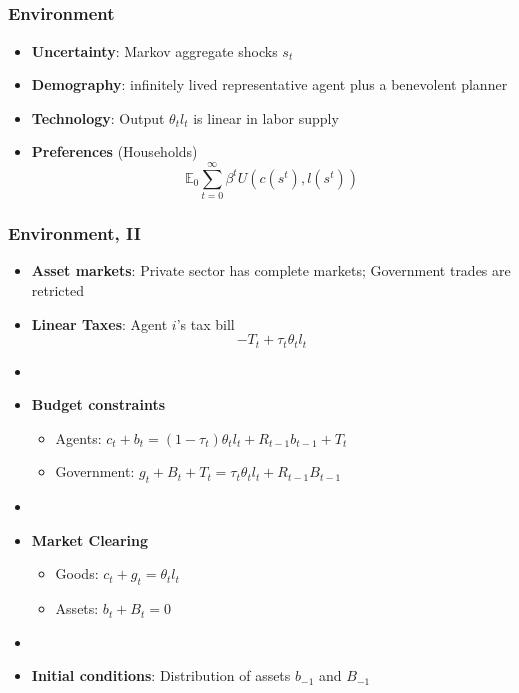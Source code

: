 \documentclass{beamer}
\begin{document}
\subsection{}

\begin{frame}
 \frametitle{Environment}
 \begin{itemize}
 \item \textbf{Uncertainty}: Markov aggregate shocks $s_t$
  \item \textbf{Demography}: infinitely lived representative agent plus a benevolent planner
  \item \textbf{Technology}: Output  $\theta_{t} l_{t}$ is linear in labor supply
  \item \textbf{Preferences }(Households)
  \begin{equation*}
\mathbb{E}_{0}\sum_{t=0}^{\infty } \beta^t  U\left(
c(s^t),l(s^t)\right)  \label{utility lifetime}
\end{equation*}%
 \end{itemize}

\end{frame}

\begin{frame}
 \frametitle{Environment, II}
 \begin{itemize}
\item \textbf{Asset markets}: Private sector has complete markets; Government trades are retricted
  \item \textbf{Linear Taxes}: Agent $i$'s tax bill
\[- T_t + \tau_t \theta_{t}l_{t}\]

\item[]
  \item \textbf{Budget constraints}
  \begin{itemize}
   \item Agents: $ c_{t}+b_{t}=\left( 1-\tau _{t}\right) \theta _{t}l_{t}+R_{t-1}b_{t-1}+T_{t}$
\item Government: $g_{t}+B_{t}+T_t=\tau _{t}\theta_{t}l_{t}+R_{t-1}B_{t-1}$
  \end{itemize}

\item[]
  \item \textbf{Market Clearing}
  \begin{itemize}
   \item Goods: $c_{t}+g_t = \theta _{t} l_{t}$

   \item Assets: $b_{t}+B_{t}=0$
\end{itemize}
  \item[]

\item \textbf{Initial conditions}: Distribution of assets $b_{-1}$ and $B_{-1}$
\end{itemize}

\end{frame}
\end{document}
